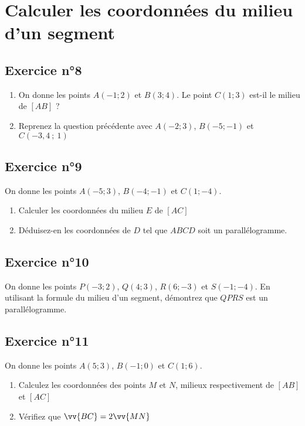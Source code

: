 \documentclass[12pt,a4paper]{article}
\begin{document}
\section{Calculer les coordonnées du milieu d'un segment}
\subsection*{Exercice n°8}

\begin{enumerate}
    \item On donne les points $A(-1;2)$ et $B(3;4)$.
Le point $C(1;3)$ est-il le milieu de $[AB]$ ?
\item Reprenez la question précédente avec $A(-2;3)$, $B(-5;-1)$ et $C(-3,4~;~1)$
\end{enumerate}


\subsection*{Exercice n°9}

On donne les points $A(-5;3)$, $B(-4;-1)$ et $C(1;-4)$.

\begin{enumerate}
    \item Calculer les coordonnées du milieu $E$ de $[AC]$
    \item Déduisez-en les coordonnées de $D$ tel que $ABCD$ soit un parallélogramme.
\end{enumerate}

\subsection*{Exercice n°10}

On donne les points $P(-3;2)$, $Q(4;3)$, $R(6;-3)$ et $S(-1;-4)$.
En utilisant la formule du milieu d'un segment, démontrez que $QPRS$ est un parallélogramme.


\subsection*{Exercice n°11}

On donne les points $A(5;3)$, $B(-1;0)$ et $C(1;6)$.

\begin{enumerate}
    \item Calculez les coordonnées des points $M$ et $N$, milieux respectivement de $[AB]$ et $[AC]$
    \item Vérifiez que $\vv{BC}=2\vv{MN}$
\end{enumerate}    
\end{document}

